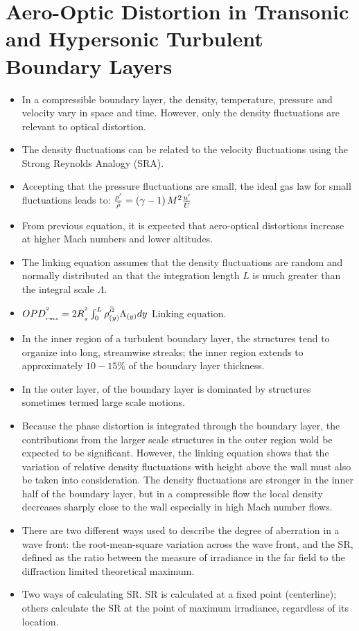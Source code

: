     \section{Aero-Optic Distortion in Transonic and Hypersonic Turbulent Boundary Layers \cite{wyckhman:aiaa:2009}}
        \begin{itemize}
            \item In a compressible boundary layer, the density, temperature, pressure and velocity vary in space and time. However, only the density fluctuations are relevant to optical distortion. 
            \item The density fluctuations can be related to the velocity fluctuations using the Strong Reynolds Analogy (SRA). 
            \item Accepting that the pressure fluctuations are small, the ideal gas law for small fluctuations leads to: $\frac{\rho^{\prime}}{\bar{\rho}} = \left(\gamma -1\right) M^2\frac{u^{\prime}}{\bar{U}} $
            \item From previous equation, it is expected that aero-optical distortions increase at higher Mach numbers and lower altitudes. 
            \item The linking equation assumes that the density fluctuations are random and normally distributed an that the integration length $L$ is much greater than the integral scale $\Lambda$.
            \item $OPD_{_{rms}}^{^{2}} = 2 R_{_{g}}^{^{2}} \int^{L}_{0} \bar{\rho^{{\prime}^2}_{\left(y\right)}} \Lambda_{\left(y\right)}dy  $ Linking equation. 
            \item In the inner region of a turbulent boundary layer, the structures tend to organize into long, streamwise streaks; the inner region extends to approximately $10-15\%$ of the boundary layer thickness.
            \item In the outer layer, of the boundary layer is dominated by structures sometimes termed large scale motions. 
            \item Because the phase distortion is integrated through the boundary layer, the contributions from the larger scale structures in the outer region wold be expected to be significant. However, the linking equation shows that the variation of relative density fluctuations with height above the wall must also be taken into consideration. The density fluctuations are stronger in the inner half of the boundary layer, but in a compressible flow the local density decreases sharply close to the wall especially in high Mach number flows. 
            \item There are two different ways used to describe the degree of aberration in a wave front: the root-mean-square variation across the wave front, and the SR, defined as the ratio between the measure of irradiance in the far field to the diffraction limited theoretical maximum. 
            \item Two ways of calculating SR. SR is calculated at a fixed point (centerline); others calculate the SR at the point of maximum irradiance, regardless of its location. 
        \end{itemize}


